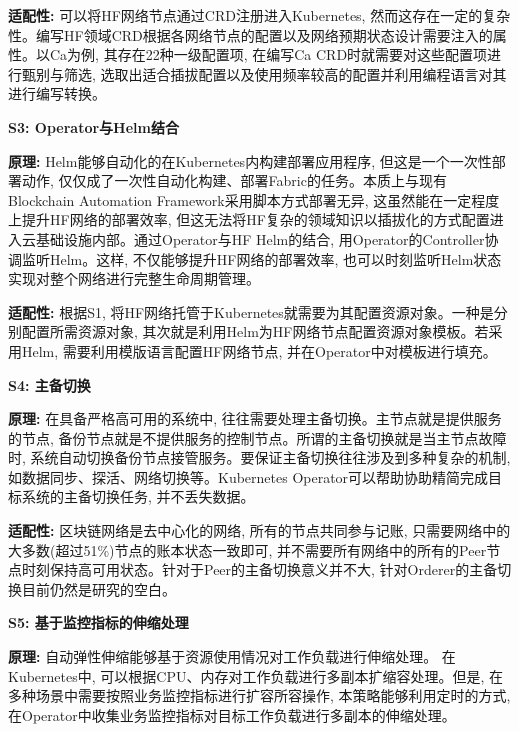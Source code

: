 \textbf{适配性: }可以将HF网络节点通过CRD注册进入Kubernetes, 然而这存在一定的复杂性。编写HF领域CRD根据各网络节点的配置\footnotemark[3]\footnotemark[4]\footnotemark[5]以及网络预期状态设计需要注入的属性。以Ca为例, 其存在22种一级配置项, 在编写Ca CRD时就需要对这些配置项进行甄别与筛选, 选取出适合插拔配置以及使用频率较高的配置并利用编程语言对其进行编写转换。

\textbf{S3: Operator与Helm结合}

\textbf{原理: } Helm能够自动化的在Kubernetes内构建部署应用程序, 但这是一个一次性部署动作, 仅仅成了一次性自动化构建、部署Fabric的任务。本质上与现有Blockchain Automation Framework采用脚本方式部署无异, 这虽然能在一定程度上提升HF网络的部署效率, 但这无法将HF复杂的领域知识以插拔化的方式配置进入云基础设施内部。通过Operator与HF Helm的结合, 用Operator的Controller协调监听Helm。这样, 不仅能够提升HF网络的部署效率, 也可以时刻监听Helm状态实现对整个网络进行完整生命周期管理。

\textbf{适配性: } 根据S1, 将HF网络托管于Kubernetes就需要为其配置资源对象。一种是分别配置所需资源对象, 其次就是利用Helm为HF网络节点配置资源对象模板。若采用Helm, 需要利用模版语言配置HF网络节点, 并在Operator中对模板进行填充。

\textbf{S4: 主备切换}

\textbf{原理: } 在具备严格高可用的系统中, 往往需要处理主备切换。主节点就是提供服务的节点, 备份节点就是不提供服务的控制节点。所谓的主备切换就是当主节点故障时, 系统自动切换备份节点接管服务。要保证主备切换往往涉及到多种复杂的机制, 如数据同步、探活、网络切换等。Kubernetes Operator可以帮助协助精简完成目标系统的主备切换任务, 并不丢失数据。

\textbf{适配性: }区块链网络是去中心化的网络, 所有的节点共同参与记账, 只需要网络中的大多数(超过51\%)节点的账本状态一致即可, 并不需要所有网络中的所有的Peer节点时刻保持高可用状态。针对于Peer的主备切换意义并不大, 针对Orderer的主备切换目前仍然是研究的空白。

\textbf{S5: 基于监控指标的伸缩处理}

\textbf{原理: } 自动弹性伸缩能够基于资源使用情况对工作负载进行伸缩处理。 在Kubernetes中, 可以根据CPU、内存对工作负载进行多副本扩缩容处理。但是, 在多种场景中需要按照业务监控指标进行扩容所容操作, 本策略能够利用定时的方式, 在Operator中收集业务监控指标对目标工作负载进行多副本的伸缩处理。

